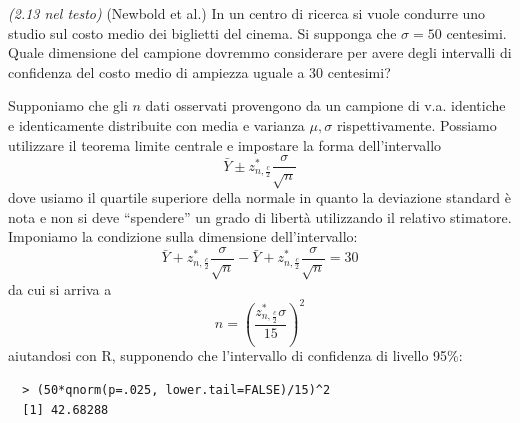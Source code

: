 \begin{exercise}{\emph{(2.13 nel testo)}}
  (Newbold et al.) In un centro di ricerca si vuole condurre uno
  studio sul costo medio dei biglietti del cinema. Si supponga che
  $\sigma = 50$ centesimi. Quale dimensione del campione dovremmo
  considerare per avere degli intervalli di confidenza del costo medio
  di ampiezza uguale a 30 centesimi?
\end{exercise}
Supponiamo che gli $n$ dati osservati provengono da un campione di
v.a. identiche e identicamente distribuite con media e varianza $\mu,
\sigma$ rispettivamente. Possiamo utilizzare il teorema limite
centrale e impostare la forma dell'intervallo $$\bar{Y} \pm
z_{n,\frac{c}{2}}^{*}\frac{\sigma}{\sqrt{n}}$$ dove usiamo il quartile
superiore della normale in quanto la deviazione standard \`e nota e
non si deve ``spendere'' un grado di libert\`a utilizzando il relativo
stimatore. Imponiamo la condizione sulla dimensione
dell'intervallo:$$\bar{Y} +
z_{n,\frac{c}{2}}^{*}\frac{\sigma}{\sqrt{n}} - \bar{Y} +
z_{n,\frac{c}{2}}^{*}\frac{\sigma}{\sqrt{n}} = 30$$ da cui si arriva
a $$n = \left (\frac{z_{n,\frac{c}{2}}^{*} \sigma}{15}\right )^2$$
aiutandosi con R, supponendo che l'intervallo di confidenza di livello 95\%:
\begin{lstlisting}
  > (50*qnorm(p=.025, lower.tail=FALSE)/15)^2
  [1] 42.68288
\end{lstlisting}


